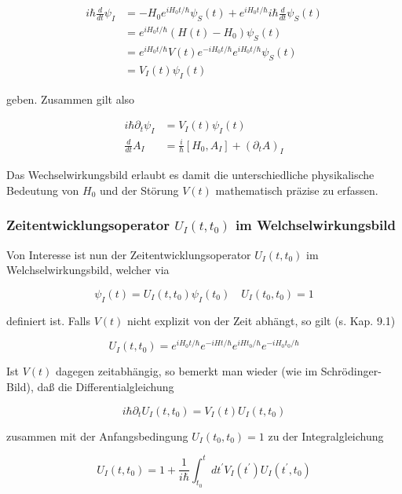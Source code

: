 \documentclass[10pt, letterpaper]{article}
\begin{document}
$$
\begin{aligned}
i \hbar \frac{d}{d t} \psi_{I} & =-H_{0} e^{i H_{0} t / \hbar} \psi_{S}(t)+e^{i H_{0} t / \hbar} i \hbar \frac{d}{d t} \psi_{S}(t) \\
& =e^{i H_{0} t / \hbar}\left(H(t)-H_{0}\right) \psi_{S}(t) \\
& =e^{i H_{0} t / \hbar} V(t) e^{-i H_{0} t / \hbar} e^{i H_{0} t / \hbar} \psi_{S}(t) \\
& =V_{I}(t) \psi_{I}(t)
\end{aligned}
$$

geben. Zusammen gilt also

$$
\begin{aligned}
i \hbar \partial_{t} \psi_{I} & =V_{I}(t) \psi_{I}(t) \\
\frac{d}{d t} A_{I} & =\frac{i}{\hbar}\left[H_{0}, A_{I}\right]+\left(\partial_{t} A\right)_{I}
\end{aligned}
$$

Das Wechselwirkungsbild erlaubt es damit die unterschiedliche physikalische Bedeutung von $H_{0}$ und der Störung $V(t)$ mathematisch präzise zu erfassen.

\subsubsection*{Zeitentwicklungsoperator $U_{I}\left(t, t_{0}\right)$ im Welchselwirkungsbild}
Von Interesse ist nun der Zeitentwicklungsoperator $U_{I}\left(t, t_{0}\right)$ im Welchselwirkungsbild, welcher via

$$
\psi_{I}(t)=U_{I}\left(t, t_{0}\right) \psi_{I}\left(t_{0}\right) \quad U_{I}\left(t_{0}, t_{0}\right)=1
$$

definiert ist. Falls $V(t)$ nicht explizit von der Zeit abhängt, so gilt (s. Kap. 9.1)

$$
U_{I}\left(t, t_{0}\right)=e^{i H_{0} t / \hbar} e^{-i H t / \hbar} e^{i H t_{0} / \hbar} e^{-i H_{0} t_{0} / \hbar}
$$

Ist $V(t)$ dagegen zeitabhängig, so bemerkt man wieder (wie im Schrödinger-Bild), daß die Differentialgleichung

$$
i \hbar \partial_{t} U_{I}\left(t, t_{0}\right)=V_{I}(t) U_{I}\left(t, t_{0}\right)
$$

zusammen mit der Anfangsbedingung $U_{I}\left(t_{0}, t_{0}\right)=1$ zu der Integralgleichung

$$
U_{I}\left(t, t_{0}\right)=1+\frac{1}{i \hbar} \int_{t_{0}}^{t} d t^{\prime} V_{I}\left(t^{\prime}\right) U_{I}\left(t^{\prime}, t_{0}\right)
$$
\end{document}
